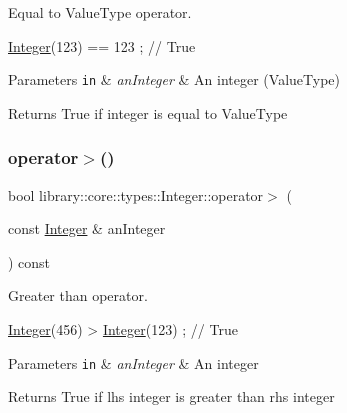 Equal to Value\+Type operator. 


\begin{DoxyCode}
\hyperlink{classlibrary_1_1core_1_1types_1_1_integer_a6483b1c4e13e5ed6af5e7a58347efead}{Integer}(123) == 123 ; \textcolor{comment}{// True}
\end{DoxyCode}



\begin{DoxyParams}[1]{Parameters}
\mbox{\tt in}  & {\em an\+Integer} & An integer (Value\+Type) \\
\hline
\end{DoxyParams}
\begin{DoxyReturn}{Returns}
True if integer is equal to Value\+Type 
\end{DoxyReturn}
\mbox{\label{classlibrary_1_1core_1_1types_1_1_integer_aa5e59aba88550137a1b120e90ab155fa}} 
\subsubsection{\texorpdfstring{operator$>$()}{operator>()}\hspace{0.1cm}{\footnotesize\ttfamily [1/2]}}
{\footnotesize\ttfamily bool library\+::core\+::types\+::\+Integer\+::operator$>$ (\begin{DoxyParamCaption}\item[{const \hyperlink{classlibrary_1_1core_1_1types_1_1_integer}{Integer} \&}]{an\+Integer }\end{DoxyParamCaption}) const}



Greater than operator. 


\begin{DoxyCode}
\hyperlink{classlibrary_1_1core_1_1types_1_1_integer_a6483b1c4e13e5ed6af5e7a58347efead}{Integer}(456) > \hyperlink{classlibrary_1_1core_1_1types_1_1_integer_a6483b1c4e13e5ed6af5e7a58347efead}{Integer}(123) ; \textcolor{comment}{// True}
\end{DoxyCode}



\begin{DoxyParams}[1]{Parameters}
\mbox{\tt in}  & {\em an\+Integer} & An integer \\
\hline
\end{DoxyParams}
\begin{DoxyReturn}{Returns}
True if lhs integer is greater than rhs integer 
\end{DoxyReturn}
\mbox{\label{classlibrary_1_1core_1_1types_1_1_integer_a1e0736e7d215b2ad2e7291a983490bf5}} 

